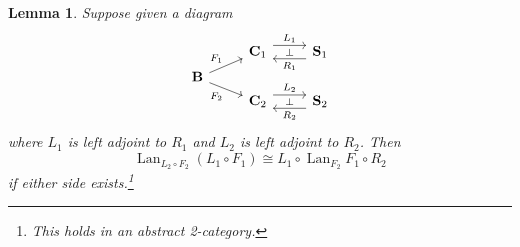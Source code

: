 \documentclass[11pt, oneside, article]{memoir}
\theoremstyle{plain}
\newtheorem{lemma}[theorem]{Lemma}
\theoremstyle{definition}
\theoremstyle{remark}
\DeclareMathOperator{\Lan}{Lan}
\newcommand{\cat}[1]{\mathbf{#1}}
\newcommand{\bB}{\cat{B}}
\newcommand{\bC}{\cat{C}}
\newcommand{\bS}{\cat{S}}
\newcommand{\La}[2]{\Lan_{#1}#2}
\begin{document}
\begin{lemma}\label{lem:kancomposeleft}
  Suppose given a diagram
  \[\begin{tikzcd}[row sep=3pt]
      & {\bC_1} & {\bS_1} \\
      {\bB}\ar[ru, "F_1"]\ar[rd, "F_2"']\\
      & {\bC_2} & {\bS_2}
      \arrow[""{name=0, anchor=center, inner sep=0}, "{L_1}", shift left=2, from=1-2, to=1-3]
      \arrow[""{name=1, anchor=center, inner sep=0}, "{R_1}", shift left=2, from=1-3, to=1-2]
      \arrow[""{name=2, anchor=center, inner sep=0}, "{L_2}", shift left=2, from=3-2, to=3-3]
      \arrow[""{name=3, anchor=center, inner sep=0}, "{R_2}", shift left=2, from=3-3, to=3-2]
      \arrow["\bot"{anchor=center},r, draw=none, from=1-2, to=1-3]
      \arrow["\bot"{anchor=center},r, draw=none, from=3-2, to=3-3]
    \end{tikzcd}\] where $L_1$ is left adjoint to $R_1$ and $L_2$ is
  left adjoint to $R_2$. Then
  \[\La{L_2 \circ F_2}{(L_1 \circ F_1)} \cong L_1 \circ \La{F_2}{F_1}
    \circ R_2\] if either side exists.\footnote{This holds in an
    abstract 2-category.}
\end{lemma}
\end{document}
